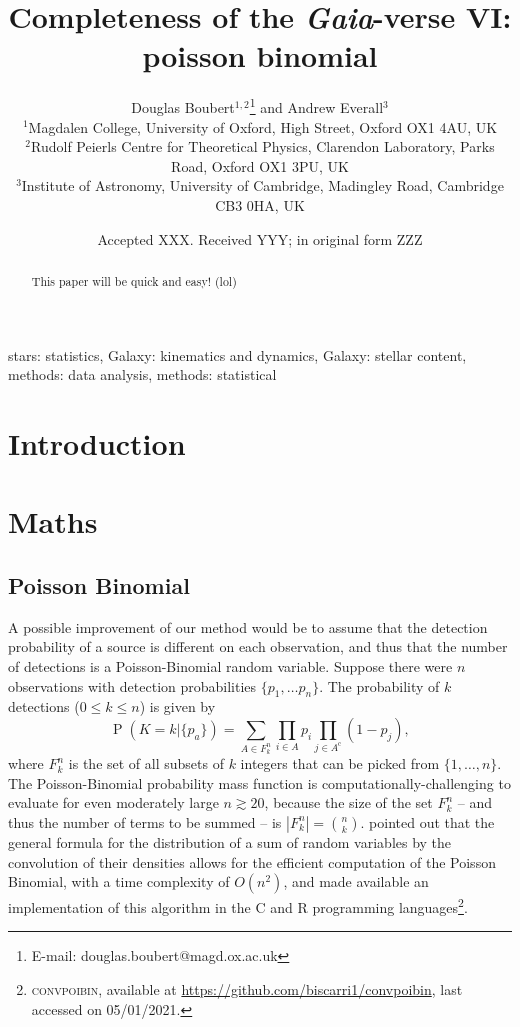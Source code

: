 \documentclass[fleqn,usenatbib]{mnras}
\title[Using hidden states to gaps and the scanning law]{Completeness of the \textit{Gaia}-verse VI: poisson binomial}
\author[D. Boubert and A. Everall]{ %
	Douglas Boubert$^{1,2}$\thanks{E-mail: douglas.boubert@magd.ox.ac.uk}
	and Andrew Everall$^{3}$
	\\
	$^{1}$Magdalen College, University of Oxford, High Street, Oxford OX1 4AU, UK\\
	$^{2}$Rudolf Peierls Centre for Theoretical Physics, Clarendon Laboratory, Parks Road, Oxford OX1 3PU, UK\\
	$^{3}$Institute of Astronomy, University of Cambridge, Madingley Road, Cambridge CB3 0HA, UK\\
}
\date{Accepted XXX. Received YYY; in original form ZZZ}
\begin{document}
\label{firstpage}
\pagerange{\pageref{firstpage}--\pageref{lastpage}}
\maketitle

\begin{abstract}
	This paper will be quick and easy! (lol)
\end{abstract}

\begin{keywords}
	stars: statistics, Galaxy: kinematics and dynamics, Galaxy: stellar content, methods: data analysis, methods: statistical
\end{keywords}



\section{Introduction}


\section{Maths}

\subsection{Poisson Binomial}

A possible improvement of our method would be to assume that the detection probability of a source is different on each observation, and thus that the number of detections is a Poisson-Binomial random variable. Suppose there were $n$ observations with detection probabilities $\{p_1,\dots p_n\}$. The probability of $k$ detections ($0\leq k \leq n$) is given by
\begin{equation}
\operatorname{P}(K=k|\{p_a\}) = \sum_{A\in F_k^n} \prod_{i\in A} p_i \prod_{j\in A^{\mathrm{c}}} (1-p_j), \label{eq:poissonbinomialpmf}
\end{equation}
where $F_k^n$ is the set of all subsets of $k$ integers that can be picked from $\{1,\dots,n\}$. The Poisson-Binomial probability mass function is computationally-challenging to evaluate for even moderately large $n\gtrsim20$, because the size of the set $F_k^n$ -- and thus the number of terms to be summed -- is $|F_k^n|=\binom{n}{k}$. \citet{Biscarri2018} pointed out that the general formula for the distribution of a sum of random variables by the convolution of their densities allows for the efficient computation of the Poisson Binomial, with a time complexity of $O(n^2)$, and made available an implementation of this algorithm in the \textsc{C} and \textsc{R} programming languages\footnote{\textsc{convpoibin}, available at \url{https://github.com/biscarri1/convpoibin}, last accessed on 05/01/2021.}.
\end{document}
